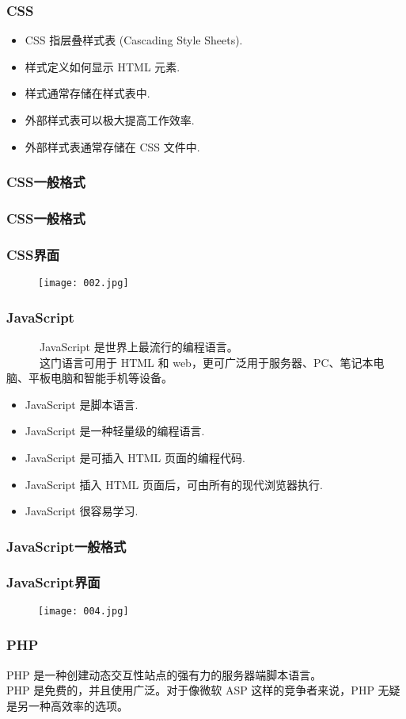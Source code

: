 \documentclass[notheorems,mathserif,table,compress]{beamer}  %
\begin{document}
\begin{frame}
 \frametitle{CSS}
 	\begin{itemize}
 	\item CSS 指层叠样式表 (Cascading Style Sheets).
 	\item 样式定义如何显示 HTML 元素.
 	\item 样式通常存储在样式表中.
 	\item 外部样式表可以极大提高工作效率.
	\item 外部样式表通常存储在 CSS 文件中.
 	\end{itemize}
\end{frame}
\begin{frame}
 \frametitle{CSS一般格式}
 	
 \end{frame}
 \begin{frame}
 \frametitle{CSS一般格式}
 	
 \end{frame}
 \begin{frame}
 \frametitle{CSS界面}
 	\begin{figure}[!ht]
	\centering\texttt{[image: 002.jpg]}
	\end{figure}
 \end{frame}
\begin{frame}
 \frametitle{JavaScript}
~~~~~~JavaScript 是世界上最流行的编程语言。\\
~~~~~~这门语言可用于 HTML 和 web，更可广泛用于服务器、PC、笔记本电脑、平板电脑和智能手机等设备。
\begin{itemize}
 	\item JavaScript 是脚本语言.
 	\item JavaScript 是一种轻量级的编程语言.
 	\item JavaScript 是可插入 HTML 页面的编程代码.
 	\item JavaScript 插入 HTML 页面后，可由所有的现代浏览器执行.
	\item JavaScript 很容易学习.
 	\end{itemize}
\end{frame}
\begin{frame}
\frametitle{JavaScript一般格式}
 	
\end{frame}
 \begin{frame}
 \frametitle{JavaScript界面}
 	\begin{figure}[!ht]
	\centering\texttt{[image: 004.jpg]}
	\end{figure}
\end{frame}
\begin{frame}
\frametitle{PHP}
 	PHP 是一种创建动态交互性站点的强有力的服务器端脚本语言。\\
PHP 是免费的，并且使用广泛。对于像微软 ASP 这样的竞争者来说，PHP 无疑是另一种高效率的选项。
\end{frame}
\end{document}
